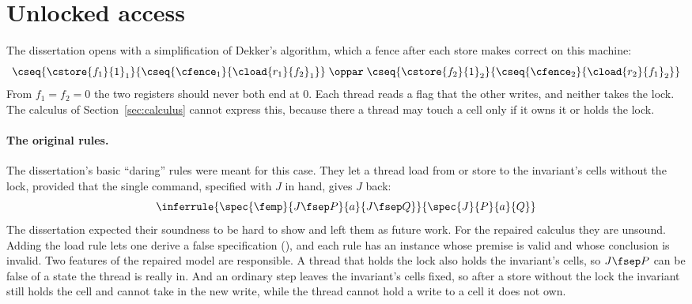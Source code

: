 \section{Unlocked access}
\label{sec:daring}

The dissertation opens with a simplification of Dekker's algorithm, which
a fence after each store makes correct on this machine:
\[
  \cseq{\cstore{f_1}{1}_1}{\cseq{\cfence_1}{\cload{r_1}{f_2}_1}}
  \;\oppar\;
  \cseq{\cstore{f_2}{1}_2}{\cseq{\cfence_2}{\cload{r_2}{f_1}_2}}
\]
From $f_1 = f_2 = 0$ the two registers should never both end at $0$. Each
thread reads a flag that the other writes, and neither takes the lock. The
calculus of Section~\ref{sec:calculus} cannot express this, because there
a thread may touch a cell only if it owns it or holds the lock.

\paragraph{The original rules.}
The dissertation's basic ``daring'' rules were meant for this case. They
let a thread load from or store to the invariant's cells without the lock,
provided that the single command, specified with $J$ in hand, gives $J$
back:
\[
  \inferrule{\spec{\femp}{J \fsep P}{a}{J \fsep Q}}{\spec{J}{P}{a}{Q}}
\]
The dissertation expected their soundness to be hard to show and left them
as future work. For the repaired calculus they are unsound. Adding the load rule lets
one derive a false specification
(), and each rule has an
instance whose premise is valid and whose conclusion is invalid. Two features of the repaired
model are responsible. A thread that holds the lock also holds the
invariant's cells, so $J \fsep P$ can be false of a state the thread is
really in. And an ordinary step leaves the invariant's cells fixed, so
after a store without the lock the invariant still holds the cell and
cannot take in the new write, while the thread cannot hold a write to a
cell it does not own.

